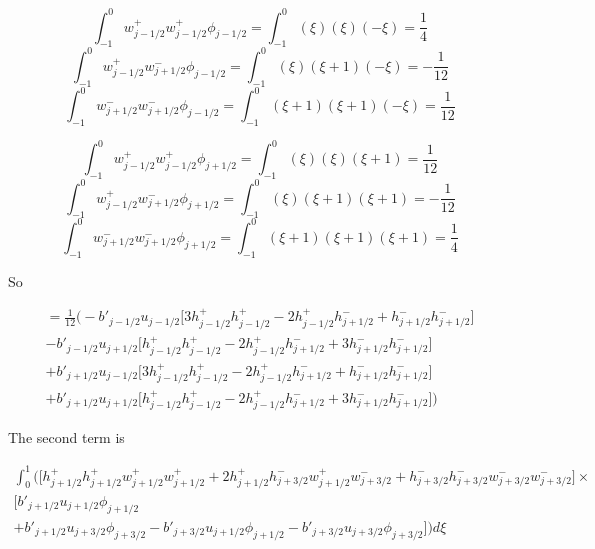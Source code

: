 \documentclass[12pt]{article}
\begin{document}
\[\int_{-1}^{0} w^+_{j-1/2}w^+_{j-1/2} \phi_{j-1/2} = \int_{-1}^{0} (\xi)(\xi) (-\xi) = \frac{1}{4}\]
\[\int_{-1}^{0} w^+_{j-1/2}w^-_{j+1/2} \phi_{j-1/2} = \int_{-1}^{0} (\xi)(\xi + 1) (-\xi ) = -\frac{1}{12}\]
\[\int_{-1}^{0} w^-_{j+1/2}w^-_{j+1/2} \phi_{j-1/2} = \int_{-1}^{0} (\xi + 1)(\xi + 1) (-\xi) = \frac{1}{12}\]

\[\int_{-1}^{0} w^+_{j-1/2}w^+_{j-1/2} \phi_{j+1/2} = \int_{-1}^{0} (\xi)(\xi) (\xi + 1) = \frac{1}{12}\]
\[\int_{-1}^{0} w^+_{j-1/2}w^-_{j+1/2} \phi_{j+1/2} = \int_{-1}^{0} (\xi)(\xi + 1) (\xi + 1) = -\frac{1}{12}\]
\[\int_{-1}^{0} w^-_{j+1/2}w^-_{j+1/2} \phi_{j+1/2} = \int_{-1}^{0} (\xi + 1)(\xi + 1) (\xi + 1) = \frac{1}{4}\]



So 

\begin{multline}
=
 \frac{1}{12}\bigg(-b'_{j-1/2}u_{j-1/2}\bigg[ 3h^+_{j-1/2}h^+_{j-1/2} - 2h^+_{j-1/2}h^-_{j+1/2}  + h^-_{j+1/2}h^-_{j+1/2} \bigg] \\- b'_{j-1/2}u_{j+1/2} \bigg[ h^+_{j-1/2}h^+_{j-1/2}  - 2h^+_{j-1/2}h^-_{j+1/2}  + 3h^-_{j+1/2}h^-_{j+1/2} \bigg] \\+ b'_{j+1/2} u_{j-1/2} \bigg[ 3h^+_{j-1/2}h^+_{j-1/2} - 2h^+_{j-1/2}h^-_{j+1/2}  + h^-_{j+1/2}h^-_{j+1/2} \bigg] \\+ b'_{j+1/2}u_{j+1/2}  \bigg[ h^+_{j-1/2}h^+_{j-1/2}  - 2h^+_{j-1/2}h^-_{j+1/2}  + 3h^-_{j+1/2}h^-_{j+1/2} \bigg] \bigg)
\end{multline}

The second term is 

\begin{multline} \int_{0}^{1}\bigg(\bigg[h^+_{j+1/2}h^+_{j+1/2} w^+_{j+1/2}w^+_{j+1/2}+ 2h^+_{j+1/2}h^-_{j+3/2} w^+_{j+1/2} w^-_{j+3/2} + h^-_{j+3/2}h^-_{j+3/2} w^-_{j+3/2}w^-_{j+3/2}\bigg] \times\\\big[ b'_{j+1/2}u_{j+1/2} \phi_{j+1/2} \\ +   b'_{j+1/2}u_{j+3/2} \phi_{j+3/2} -  b'_{j+3/2} u_{j+1/2}\phi_{j+1/2} -  b'_{j+3/2}u_{j+3/2}\phi_{j+3/2}  \big]  \bigg) d\xi
\end{multline}
\end{document}
